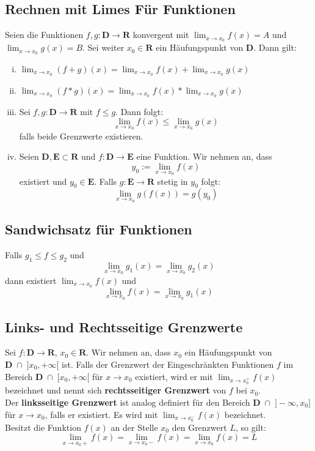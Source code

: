 \documentclass[8pt]{extarticle}
\begin{document}
\begin{multicols*}{3}
\subsection{Rechnen mit Limes Für Funktionen}
Seien die Funktionen $f, g: \mathbf{D} \rightarrow \mathbf{R}$ konvergent mit
$\lim_{x \rightarrow x_0} f(x) = A$ und $\lim_{x \rightarrow x_0} g(x) = B$. Sei weiter
$x_0 \in \mathbf{R}$ ein Häufungspunkt von $\mathbf{D}$.
Dann gilt:
\begin{enumerate}[(i)]
  \item $\lim_{x \rightarrow x_0} (f + g)(x) = \lim_{x \rightarrow x_0} f(x) + \lim_{x \rightarrow x_0} g(x)$
  \item $\lim_{x \rightarrow x_0} (f * g)(x) = \lim_{x \rightarrow x_0} f(x) * \lim_{x \rightarrow x_0} g(x)$
  \item Sei $f, g: \mathbf{D} \rightarrow \mathbf{R} \text{ mit } f \leq g$. Dann folgt:
  $$
    \lim_{x \rightarrow x_0} f(x) \leq \lim_{x \rightarrow x_0} g(x)
  $$
  falls beide Grenzwerte existieren.
  \item Seien $\mathbf{D}, \mathbf{E} \subset \mathbf{R}$ und $f: \mathbf{D} \rightarrow \mathbf{E}$ eine Funktion. Wir nehmen an, dass $$y_0 := \lim_{x \rightarrow x_0} f(x)$$ existiert
  und $y_0 \in \mathbf{E}$. Falls $g:\mathbf{E} \rightarrow \mathbf{R}$ stetig in $y_0$ folgt:
  $$\lim_{x \rightarrow x_0} g(f(x)) = g(y_0)$$
\end{enumerate}
  \subsection{Sandwichsatz für Funktionen}
Falls $g_1 \leq f \leq g_2$ und
  $$
  \lim_{x \rightarrow x_0} g_1(x) = \lim_{x \rightarrow x_0} g_2(x)
  $$
  dann existiert $\lim_{x \rightarrow x_0} f(x)$ und
  $$
  \lim_{x \rightarrow x_0} f(x) = \lim_{x \rightarrow x_0} g_1(x)
  $$
 \subsection{Links- und Rechtsseitige Grenzwerte}
Sei $f: \mathbf{D} \rightarrow \mathbf{R}$, $x_0 \in \mathbf{R}$. Wir nehmen an, dass
$x_0$ ein Häufungspunkt von $\mathbf{D} \;\cap\; ]x_0, +\infty[$ ist. Falls der Grenzwert
der Eingeschränkten Funktionen $f$ im Bereich $\mathbf{D} \;\cap\; [x_0, +\infty[$ für
$x \rightarrow x_0$ existiert, wird er mit $\lim_{x \rightarrow x_0^+} f(x)$ bezeichnet und
nennt sich \textbf{rechtsseitiger Grenzwert} von $f$ bei $x_0$.\\
Der \textbf{linksseitige Grenzwert} ist analog definiert für den Bereich $\mathbf{D} \;\cap\; ]-\infty, x_0]$
für $x \rightarrow x_0$, falls er existiert. Es wird mit $\lim_{x \rightarrow x_0^-} f(x)$ bezeichnet.\\
Besitzt die Funktion $f(x)$ an der Stelle $x_0$ den Grenzwert $L$, so gilt:
$$
  \lim_{x \rightarrow x_0+} f(x) = \lim_{x \rightarrow x_0-} f(x) = \lim_{x \rightarrow x_0} f(x) = L
$$


\end{multicols*}
\end{document}
